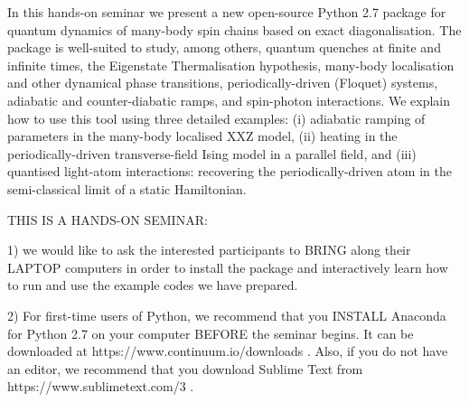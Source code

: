 \documentclass{article}
\begin{document}
In this hands-on seminar we present a new open-source Python 2.7 package for quantum dynamics of many-body spin chains based on exact diagonalisation. The package is well-suited to study, among others, quantum quenches at finite and infinite times, the Eigenstate Thermalisation hypothesis, many-body localisation and other dynamical phase transitions, periodically-driven (Floquet) systems, adiabatic and counter-diabatic ramps, and spin-photon interactions. We explain how to use this tool using three detailed examples: (i) adiabatic ramping of parameters in the many-body localised XXZ model, (ii) heating in the periodically-driven transverse-field Ising model in a parallel field, and (iii) quantised light-atom interactions: recovering the periodically-driven atom in the semi-classical limit of a static Hamiltonian. 

THIS IS A HANDS-ON SEMINAR:
 
1) we would like to ask the interested participants to BRING along their LAPTOP computers in order to install the package and interactively learn how to run and use the example codes we have prepared. 

2) For first-time users of Python, we recommend that you INSTALL Anaconda for Python 2.7 on your computer BEFORE the seminar begins. It can be downloaded at https://www.continuum.io/downloads . Also, if you do not have an editor, we recommend that you download Sublime Text from https://www.sublimetext.com/3 .
\end{document}
